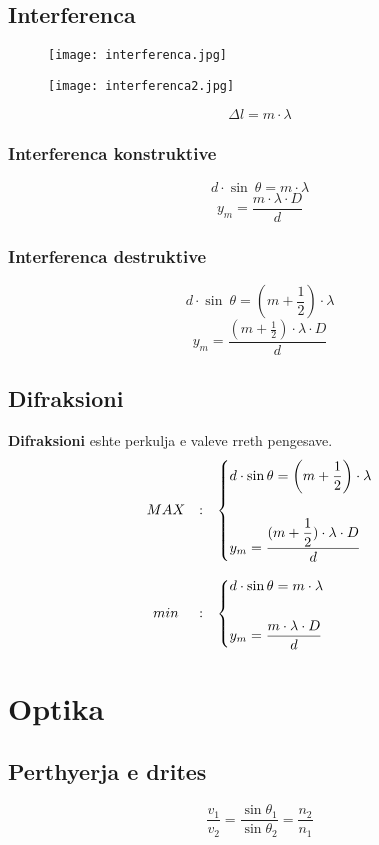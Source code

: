 \documentclass[a4paper, twocolumn]{article}
\begin{document}
\subsection{Interferenca}
\begingroup
\begin{figure}[ht!]
	\centering
	\texttt{[image: interferenca.jpg]}
\end{figure}
\begin{figure}[ht!]
	\centering
	\texttt{[image: interferenca2.jpg]}
\end{figure}
\endgroup
\[
\Delta l = m \cdot \lambda
\]
\subsubsection{Interferenca konstruktive}
\[
d \cdot \sin \: \theta = m \cdot \lambda
\]
\[
y_m=\frac{m\cdot \lambda \cdot D}{d}
\]
\subsubsection{Interferenca destruktive}
\[
d \cdot \sin\: \theta = \left( m + \frac{1}{2} \right) \cdot \lambda
\]
\[
y_m=\frac{(m+\frac{1}{2}) \cdot \lambda \cdot D}{d}
\]
\subsection{Difraksioni}
\textbf{Difraksioni} eshte perkulja e valeve rreth pengesave.\\
\[
\begin{array}{ccl}
	MAX & : &
	\begin{dcases}
		d \cdot \sin\theta = \left( m + \dfrac{1}{2} \right) \cdot \lambda \\
		\\
		y_m=\dfrac{(m+\dfrac{1}{2}) \cdot \lambda \cdot D}{d}
	\end{dcases} \\
	\\
	min & : &
	\begin{dcases}
		d \cdot \sin\theta = m \cdot  \lambda \\
		\\
		y_m=\dfrac{m\cdot \lambda \cdot D}{d}
	\end{dcases}
\end{array}
\]
\section{Optika}
\subsection{Perthyerja e drites}
\[
\frac{v_1}{v_2} = \frac{\sin \theta_1}{\sin \theta_2} =\frac{n_2}{n_1}
\]
\end{document}
